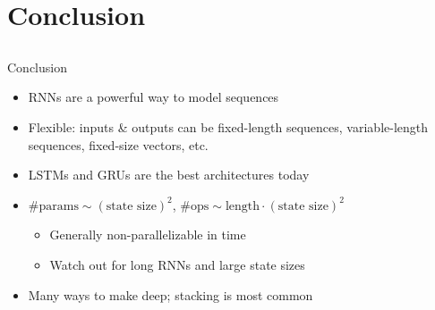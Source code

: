 \section{Conclusion}
\subsection{}

\begin{frame}{Conclusion}
    \begin{itemize}
        \item RNNs are a powerful way to model sequences
        \item Flexible: inputs \& outputs can be fixed-length sequences, variable-length sequences, fixed-size vectors, etc.
        \item LSTMs and GRUs are the best architectures today
        \item $\# \text{params} \sim (\text{state size})^2$,
        $\# \text{ops} \sim \text{length} \cdot (\text{state size})^2$
        \begin{itemize}
            \item Generally non-parallelizable in time
            \item Watch out for long RNNs and large state sizes
        \end{itemize}
        \item Many ways to make deep; stacking is most common
    \end{itemize}
\end{frame}

